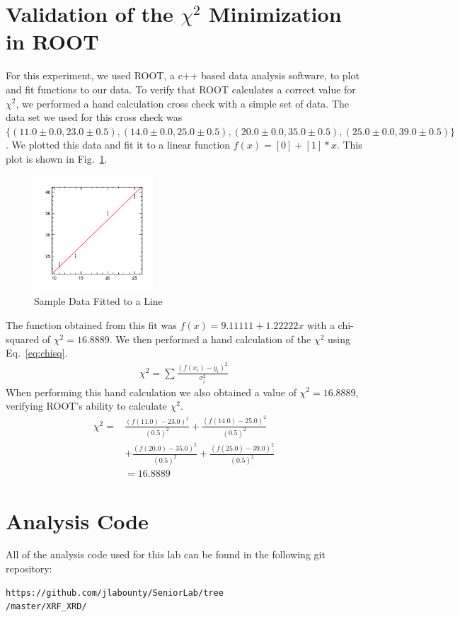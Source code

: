 \documentclass[%
 reprint,
 amsmath,amssymb,
 aps,
 pra,
]{revtex4-1}
\begin{document}
\begin{appendix}
\section{Validation of the $\chi^2$ Minimization in ROOT} \label{section:root}
For this experiment, we used ROOT, a c++ based data analysis software, to plot and fit functions to our data. To verify that ROOT calculates a correct value for $\chi^{2}$, we performed a hand calculation cross check with a simple set of data. The data set we used for this cross check was $\{ (11.0 \pm 0.0, 23.0 \pm 0.5), (14.0 \pm 0.0, 25.0 \pm 0.5), (20.0 \pm 0.0, 35.0 \pm 0.5), (25.0 \pm 0.0, 39.0 \pm 0.5) \}$. We plotted this data and fit it to a linear function $f(x) = [0] + [1]*x$. This plot is shown in Fig.~\ref{Fig:rootproof}.
\begin{figure}[H]
	\centering
	\includegraphics[width=0.4\textwidth]{rootproof.png}
	\caption{Sample Data Fitted to a Line}
	\label{Fig:rootproof}
\end{figure}
The function obtained from this fit was $f(x) = 9.11111 + 1.22222x$ with a chi-squared of $\chi ^{2} = 16.8889$. We then performed a hand calculation of the $\chi ^{2}$ using Eq.~\ref{eq:chisq}.
\begin{gather}\label{eq:chisq}
\chi ^{2} = \sum \frac{(f(x_i) - y_i)^{2}}{\sigma_i^2}
\end{gather}
When performing this hand calculation we also obtained a value of $\chi ^{2} = 16.8889$, verifying ROOT's ability to calculate $\chi ^{2}$.
\begin{align*}
\chi ^{2} =& \frac{(f(11.0) - 23.0)^{2}}{(0.5)^2} + \frac{(f(14.0) - 25.0)^{2}}{(0.5)^2} \\
&+ \frac{(f(20.0) - 35.0)^2}{(0.5)^2} + \frac{(f(25.0) - 39.0)^{2}}{(0.5)^2} \\
&= 16.8889
\end{align*}

\section{Analysis Code} \label{section:analysis_code}
All of the analysis code used for this lab can be found in the following git repository: 
\begin{verbatim}
https://github.com/jlabounty/SeniorLab/tree
/master/XRF_XRD/
\end{verbatim}

\end{appendix}
\end{document}
